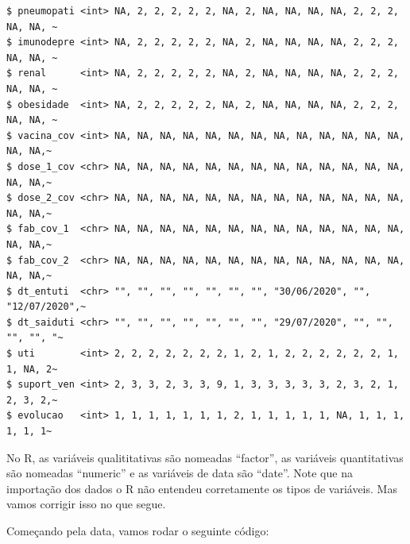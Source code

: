 \documentclass[
  letterpaper,
  DIV=11,
  numbers=noendperiod]{scrreprt}
\newenvironment{Shaded}{\begin{snugshade}}{\end{snugshade}}
\newcommand{\AttributeTok}[1]{\textcolor[rgb]{0.40,0.45,0.13}{#1}}
\newcommand{\FunctionTok}[1]{\textcolor[rgb]{0.28,0.35,0.67}{#1}}
\newcommand{\NormalTok}[1]{\textcolor[rgb]{0.00,0.23,0.31}{#1}}
\newcommand{\OtherTok}[1]{\textcolor[rgb]{0.00,0.23,0.31}{#1}}
\newcommand{\SpecialCharTok}[1]{\textcolor[rgb]{0.37,0.37,0.37}{#1}}
\newcommand{\StringTok}[1]{\textcolor[rgb]{0.13,0.47,0.30}{#1}}
\begin{document}
\begin{verbatim}
$ pneumopati <int> NA, 2, 2, 2, 2, 2, NA, 2, NA, NA, NA, NA, 2, 2, 2, NA, NA, ~
$ imunodepre <int> NA, 2, 2, 2, 2, 2, NA, 2, NA, NA, NA, NA, 2, 2, 2, NA, NA, ~
$ renal      <int> NA, 2, 2, 2, 2, 2, NA, 2, NA, NA, NA, NA, 2, 2, 2, NA, NA, ~
$ obesidade  <int> NA, 2, 2, 2, 2, 2, NA, 2, NA, NA, NA, NA, 2, 2, 2, NA, NA, ~
$ vacina_cov <int> NA, NA, NA, NA, NA, NA, NA, NA, NA, NA, NA, NA, NA, NA, NA,~
$ dose_1_cov <chr> NA, NA, NA, NA, NA, NA, NA, NA, NA, NA, NA, NA, NA, NA, NA,~
$ dose_2_cov <chr> NA, NA, NA, NA, NA, NA, NA, NA, NA, NA, NA, NA, NA, NA, NA,~
$ fab_cov_1  <chr> NA, NA, NA, NA, NA, NA, NA, NA, NA, NA, NA, NA, NA, NA, NA,~
$ fab_cov_2  <chr> NA, NA, NA, NA, NA, NA, NA, NA, NA, NA, NA, NA, NA, NA, NA,~
$ dt_entuti  <chr> "", "", "", "", "", "", "", "30/06/2020", "", "12/07/2020",~
$ dt_saiduti <chr> "", "", "", "", "", "", "", "29/07/2020", "", "", "", "", "~
$ uti        <int> 2, 2, 2, 2, 2, 2, 2, 1, 2, 1, 2, 2, 2, 2, 2, 2, 1, 1, NA, 2~
$ suport_ven <int> 2, 3, 3, 2, 3, 3, 9, 1, 3, 3, 3, 3, 3, 2, 3, 2, 1, 2, 3, 2,~
$ evolucao   <int> 1, 1, 1, 1, 1, 1, 1, 2, 1, 1, 1, 1, 1, NA, 1, 1, 1, 1, 1, 1~
\end{verbatim}

No R, as variáveis qualititativas são nomeadas ``factor'', as variáveis
quantitativas são nomeadas ``numeric'' e as variáveis de data são
``date''. Note que na importação dos dados o R não entendeu corretamente
os tipos de variáveis. Mas vamos corrigir isso no que segue.

Começando pela data, vamos rodar o seguinte código:

\begin{Shaded}
\end{Shaded}
\end{document}
